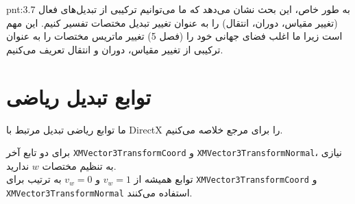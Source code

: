 {\begin{spacing}{1.5}
        \begin{point}{pnt:3.7}
            \Large
            به طور خاص، این بحث نشان می‌دهد که ما می‌توانیم ترکیبی از تبدیل‌های فعال (تغییر مقیاس، دوران، انتقال) را به عنوان تغییر تبدیل مختصات تفسیر کنیم.
            این مهم است زیرا ما اغلب فضای جهانی خود را (فصل 5) تغییر ماتریس مختصات را به عنوان ترکیبی از تغییر مقیاس، دوران و انتقال تعریف می‌کنیم.
        \end{point}
    \end{spacing}
}


\section{\textbf{توابع تبدیل ریاضی }}
\label{sec:3.6}
{
    \Large
    \begin{spacing}{1.5}
        ما توابع ریاضی تبدیل مرتبط با DirectX را برای مرجع خلاصه می‌کنیم.

        \textbf{\vspace{6pt}}
        \lr{}
        \textbf{\vspace{6pt}}

        برای دو تابع آخر \texttt{XMVector3TransformCoord} و \texttt{XMVector3TransformNormal}، نیازی به تنظیم مختصات $w$ ندارید.\\
        توابع همیشه از $v_{w}=1$ و $v_{w}=0$ به ترتیب برای \texttt{XMVector3TransformCoord} و \texttt{XMVector3TransformNormal} استفاده می‌کنند.
    \end{spacing}
}
\newpage


